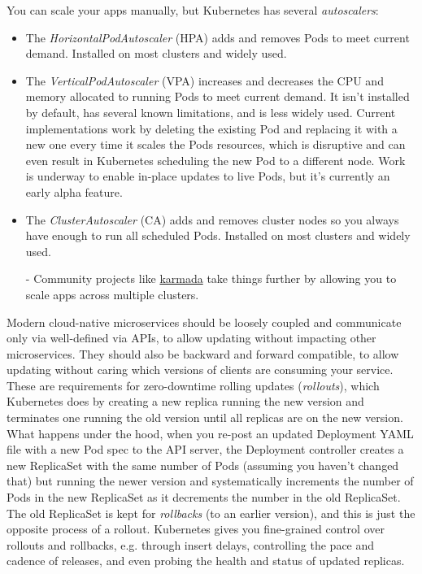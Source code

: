 \documentclass[8pt, table, xcdraw]{article}%
\begin{document}
You can scale your apps manually, but Kubernetes has several \emph{autoscalers}:

\begin{itemize}
    \item The \emph{HorizontalPodAutoscaler} (HPA) adds and removes Pods to meet current demand. Installed on most clusters and widely used.
    \item The \emph{VerticalPodAutoscaler} (VPA) increases and decreases the CPU and memory allocated to running Pods to meet current demand. It isn’t installed by default, has several known limitations, and is less widely used. Current implementations work by deleting the existing Pod and replacing it with a new one every time it scales the Pods resources, which is disruptive and can even result in Kubernetes scheduling the new Pod to a different node. Work is underway to enable in-place updates to live Pods, but it’s
    currently an early alpha feature.
    \item The \emph{ClusterAutoscaler} (CA) adds and removes cluster nodes so you always have enough to run all scheduled Pods. Installed on most clusters and widely used.
    \item[-] Community projects like \href{https://karmada.io/}{karmada} take things further by allowing you to scale apps across multiple clusters.
\end{itemize}

Modern cloud-native microservices should be loosely coupled and communicate only via well-defined via APIs, to allow updating without impacting other microservices. They should also be backward and forward compatible, to allow updating without caring which versions of clients are consuming your service. These are requirements for zero-downtime rolling updates (\emph{rollouts}), which Kubernetes does by creating a new replica running the new version and terminates one running the old version until all replicas are on the new version. What happens under the hood, when you re-post an updated Deployment YAML file with a new Pod spec to the API server, the Deployment controller creates a new ReplicaSet with the same number of Pods (assuming you haven't changed that) but running the newer version and systematically increments the number of Pods in the new ReplicaSet as it decrements the number in the old ReplicaSet. The old ReplicaSet is kept for \emph{rollbacks} (to an earlier version), and this is just the opposite process of a rollout. Kubernetes gives you fine-grained control over rollouts and rollbacks, e.g. through insert delays, controlling the pace and cadence of releases, and even probing the health and status of updated replicas.
\end{document}
